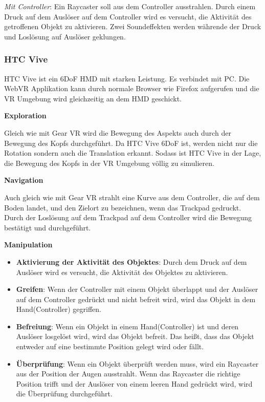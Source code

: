   \textsl{Mit Controller}: Ein Raycaster soll aus dem Controller ausstrahlen. Durch einem Druck auf dem Auslöser auf dem Controller wird es versucht, die Aktivität des getroffenen Objekt zu aktivieren. Zwei Soundeffekten werden währende der Druck und Loslösung auf Auslöser geklungen.
  
 \subsubsection{HTC Vive}
 HTC Vive ist ein 6DoF HMD mit starken Leistung. Es verbindet mit PC. Die WebVR Applikation kann durch normale Browser wie Firefox aufgerufen und die VR Umgebung wird gleichzeitig an dem HMD geschickt.
 
  \textbf{Exploration}
  
  Gleich wie mit Gear VR wird die Bewegung des Aspekts auch durch der Bewegung des Kopfs durchgeführt. Da HTC Vive 6DoF ist, werden nicht nur die Rotation sondern auch die Translation  erkannt. Sodass ist HTC Vive in der Lage, die Bewegung des Kopfs in der VR Umgebung völlig zu simulieren.
  
  \textbf{Navigation}
  
  Auch gleich wie mit Gear VR strahlt eine Kurve aus dem Controller, die auf dem Boden landet, und den Zielort zu bezeichnen, wenn das Trackpad gedruckt. Durch der Loslösung auf dem Trackpad auf dem Controller wird die Bewegung bestätigt und durchgeführt.
  
  \textbf{Manipulation}
  \begin{itemize}
  \item \textbf{Aktivierung der Aktivität des Objektes}: Durch dem Druck auf dem Auslöser wird es versucht, die Aktivität des Objektes zu aktivieren.
  \item \textbf{Greifen}: Wenn der Controller mit einem Objekt überlappt und der Auslöser auf dem Controller gedrückt und nicht befreit wird, wird das Objekt in dem Hand(Controller) gegriffen.
  \item \textbf{Befreiung}: Wenn ein Objekt in einem Hand(Controller) ist und deren Auslöser losgelöst wird, wird das Objekt befreit. Das heißt, dass das Objekt entweder auf eine bestimmte Position gelegt wird oder fällt.
  \item \textbf{Überprüfung}: Wenn ein Objekt überprüft werden muss, wird ein Raycaster aus der Position der Augen ausstrahlt. Wenn das Raycaster die richtige Position trifft und der Auslöser von einem leeren Hand gedrückt wird, wird die Überprüfung durchgeführt.
  \end{itemize}
  
